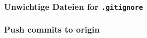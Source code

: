 \documentclass[12pt,ngerman]{beamer}
\begin{document}
\begin{frame}
\frametitle{Unwichtige Dateien for \texttt{.gitignore}}

\begin{center}
\end{center}

\end{frame}

\begin{frame}
\frametitle{Push commits to origin}

\begin{center}
\end{center}

\end{frame}
\end{document}
